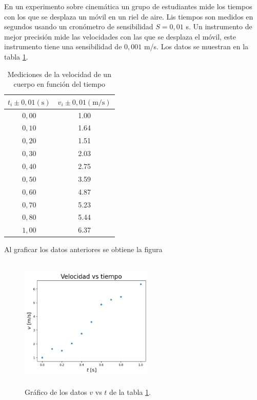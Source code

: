En un experimento sobre cinem\'atica un grupo de estudiantes mide los tiempos con los que se desplaza  un m\'ovil en un riel de aire. Lis tiempos son medidos en segundos usando un cron\'ometro de sensibilidad $S=0,01$ s. Un instrumento de mejor precisi\'on mide las velocidades con las que se desplaza el m\'ovil, este instrumento tiene una sensibilidad de $0,001$ m/s.  Los datos se muestran en la tabla \ref{datos1}.
\begin{table}[h]
\begin{center}
\begin{tabular}{|c|c|}
\hline $t_i \pm 0,01 (\mathrm{s})$ & $v_i \pm 0,01 (\mathrm{m/s})$  \\\hline \hline 
\hline $0,00$ & 1.00 \\
\hline $0,10$ & 1.64 \\
\hline $0,20$ & 1.51 \\
\hline $0,30$ & 2.03 \\
\hline $0,40$ & 2.75 \\
\hline $0,50$ & 3.59 \\
\hline $0,60$ & 4.87 \\
\hline $0,70$ & 5.23 \\
\hline $0,80$ & 5.44 \\
\hline $1,00$ & 6.37 \\
\hline
\end{tabular}
\end{center}
\caption{Mediciones de la velocidad de un cuerpo en funci\'on del tiempo}
\label{datos1}
\end{table}

Al graficar los datos anteriores se obtiene la figura
\begin{figure}[h]
\begin{center}
\includegraphics[height=2.5in,width=2.5in]{figuras/fig12}  
\caption{Gr\'afico de los datos $v$ vs $t$ de la tabla \ref{datos1}.}
\label{figdatos1}
\end{center}
\end{figure}

